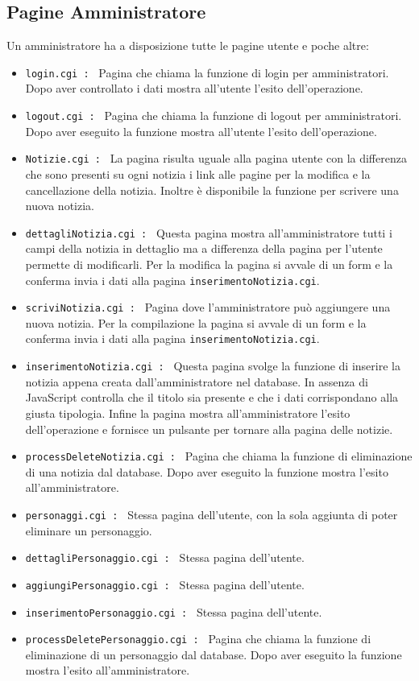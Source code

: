 \documentclass{article}
\begin{document}
\subsection{Pagine Amministratore}
		Un amministratore ha a disposizione tutte le pagine utente e poche altre:
		\begin{itemize}
			\item \texttt{login.cgi : } Pagina che chiama la funzione di login per amministratori. Dopo aver controllato i dati
				mostra all'utente l'esito dell'operazione.
			\item \texttt{logout.cgi : } Pagina che chiama la funzione di logout per amministratori. Dopo aver eseguito la 
				funzione mostra all'utente l'esito dell'operazione.
			\item \texttt{Notizie.cgi : } La pagina risulta uguale alla pagina utente con la differenza che sono presenti su 
				ogni notizia i link alle pagine per la modifica e la cancellazione della notizia. 
				Inoltre è disponibile la funzione per scrivere una nuova notizia.				
			\item \texttt{dettagliNotizia.cgi : } Questa pagina mostra all'amministratore tutti i campi della notizia in
				 dettaglio ma a differenza della pagina per l'utente permette di modificarli.
				 Per la modifica la pagina si avvale di un form e la conferma invia i dati alla pagina 
				\texttt{inserimentoNotizia.cgi}.
			\item \texttt{scriviNotizia.cgi : } Pagina dove l'amministratore può aggiungere una nuova notizia.
				Per la compilazione la pagina si avvale di un form e la conferma invia i dati alla pagina 
				\texttt{inserimentoNotizia.cgi}.
			\item \texttt{inserimentoNotizia.cgi : } Questa pagina svolge la funzione di inserire la notizia appena
				creata dall'amministratore nel database. In assenza di JavaScript controlla che il titolo sia presente
				e che i dati corrispondano alla giusta tipologia. Infine la pagina mostra all'amministratore l'esito 
				dell'operazione e fornisce un pulsante per tornare alla pagina delle notizie.
			\item \texttt{processDeleteNotizia.cgi : } Pagina che chiama la funzione di eliminazione di una notizia dal
				database. Dopo aver eseguito la funzione mostra l'esito all'amministratore.
			\item \texttt{personaggi.cgi : } Stessa pagina dell'utente, con la sola aggiunta di poter eliminare un personaggio.
			\item \texttt{dettagliPersonaggio.cgi : } Stessa pagina dell'utente.
			\item \texttt{aggiungiPersonaggio.cgi : } Stessa pagina dell'utente.
			\item \texttt{inserimentoPersonaggio.cgi : } Stessa pagina dell'utente.
			\item \texttt{processDeletePersonaggio.cgi : } Pagina che chiama la funzione di eliminazione di un personaggio dal
				database. Dopo aver eseguito la funzione mostra l'esito all'amministratore.
		\end{itemize}			
\end{document}
